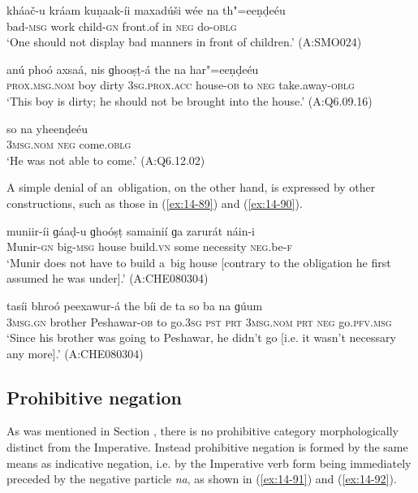 \begin{exe}
\ex
\label{ex:14-86}
\gll kháač-u kráam kuṇaak-íi maxadúši wée na  th"=eeṇḍeéu \\
bad-\textsc{msg} work child-\textsc{gn} front.of in \textsc{neg} do-\textsc{oblg } \\
\glt `One should not display bad manners in front of children.' (A:SMO024)

\ex
\label{ex:14-87}
\gll anú phoó axsaá, nis ɡhooṣṭ-á  the na har"=eeṇḍeéu \\
\textsc{prox.msg.nom} boy dirty \textsc{3sg.prox.acc} house-\textsc{ob}  to \textsc{neg} take.away-\textsc{oblg } \\
\glt `This boy is dirty; he should not be brought into the house.' (A:Q6.09.16)

\ex
\label{ex:14-88}
\gll so na yheenḍeéu \\
\textsc{3msg}.\textsc{nom} \textsc{neg} come.\textsc{oblg}  \\
\glt `He was not able to come.' (A:Q6.12.02)
\end{exe}

A simple denial of an~obligation, on the other hand, is expressed by other constructions, such as those in (\ref{ex:14-89}) and (\ref{ex:14-90}).

\begin{exe}
\ex
\label{ex:14-89}
\gll muniir-íi ɡáaḍ-u ɡhoóṣṭ samainií ɡa zarurát  náin-i \\
Munir-\textsc{gn} big-\textsc{msg} house build.\textsc{vn} some necessity  \textsc{neg.}be-\textsc{f } \\
\glt `Munir does not have to build a~big house [contrary to the obligation he first assumed he was under].' (A:CHE080304)

\ex
\label{ex:14-90}
\gll tasíi bhroó peexawur-á the bíi de ta  so ba na ɡúum \\
\textsc{3msg}.\textsc{gn} brother Peshawar-\textsc{ob} to go.\textsc{3sg} \textsc{pst} \textsc{prt}  \textsc{3msg.nom} \textsc{prt} \textsc{neg} go.\textsc{pfv.msg } \\
\glt `Since his brother was going to Peshawar, he didn't go [i.e. it wasn't necessary any more].' (A:CHE080304)
\end{exe}

\subsection{Prohibitive negation}
\label{subsec:14-3-5}


As was mentioned in Section , there is no prohibitive category morphologically distinct from the Imperative. Instead prohibitive negation is formed by the same means as indicative negation, i.e. by the Imperative verb form being immediately preceded by the negative particle \textit{na}, as shown in (\ref{ex:14-91}) and (\ref{ex:14-92}).

